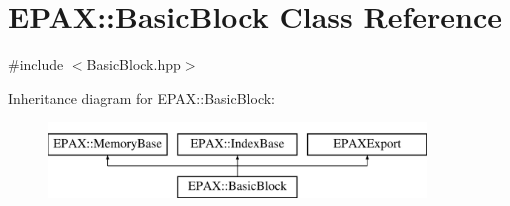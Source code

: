 \hypertarget{class_e_p_a_x_1_1_basic_block}{\section{\-E\-P\-A\-X\-:\-:\-Basic\-Block \-Class \-Reference}
\label{class_e_p_a_x_1_1_basic_block}
}


{\ttfamily \#include $<$\-Basic\-Block.\-hpp$>$}

\-Inheritance diagram for \-E\-P\-A\-X\-:\-:\-Basic\-Block\-:\begin{figure}[H]
\begin{center}
\leavevmode
\includegraphics[height=2.000000cm]{class_e_p_a_x_1_1_basic_block}
\end{center}
\end{figure}
